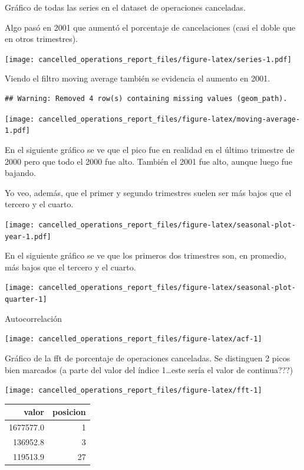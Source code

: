 \documentclass[
]{article}
\begin{document}
Gráfico de todas las series en el dataset de operaciones canceladas.

Algo pasó en 2001 que aumentó el porcentaje de cancelaciones (casi el
doble que en otros trimestres).

\texttt{[image: cancelled\_operations\_report\_files/figure-latex/series-1.pdf]}

Viendo el filtro moving average también se evidencia el aumento en 2001.

\begin{verbatim}
## Warning: Removed 4 row(s) containing missing values (geom_path).
\end{verbatim}

\texttt{[image: cancelled\_operations\_report\_files/figure-latex/moving-average-1.pdf]}

En el siguiente gráfico se ve que el pico fue en realidad en el último
trimestre de 2000 pero que todo el 2000 fue alto. También el 2001 fue
alto, aunque luego fue bajando.

Yo veo, además, que el primer y segundo trimestres suelen ser más bajos
que el tercero y el cuarto.

\texttt{[image: cancelled\_operations\_report\_files/figure-latex/seasonal-plot-year-1.pdf]}

En el siguiente gráfico se ve que los primeros dos trimestres son, en
promedio, más bajos que el tercero y el cuarto.

\begin{center}\texttt{[image: cancelled\_operations\_report\_files/figure-latex/seasonal-plot-quarter-1]} \end{center}

Autocorrelación

\begin{center}\texttt{[image: cancelled\_operations\_report\_files/figure-latex/acf-1]} \end{center}

Gráfico de la fft de porcentaje de operaciones canceladas. Se distinguen
2 picos bien marcados (a parte del valor del índice 1\ldots este sería
el valor de continua???)

\begin{center}\texttt{[image: cancelled\_operations\_report\_files/figure-latex/fft-1]} \end{center}

\begin{longtable}[]{@{}rr@{}}
\toprule
valor & posicion\tabularnewline
\midrule
\endhead
1677577.0 & 1\tabularnewline
136952.8 & 3\tabularnewline
119513.9 & 27\tabularnewline
\bottomrule
\end{longtable}
\end{document}
